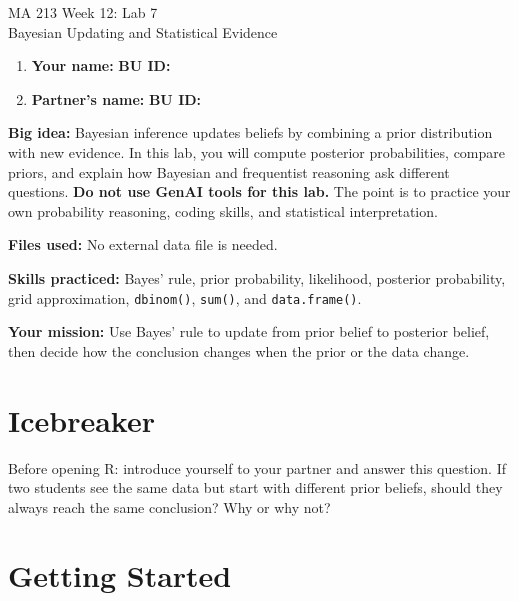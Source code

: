 \documentclass[11pt]{article}
\newcommand{\shortwritebox}[1]{
  \vspace{3pt}
  \noindent\fbox{
    \begin{minipage}{0.96\linewidth}
      \textbf{#1}\\[12pt]
      \rule{\linewidth}{0.4pt}\\[14pt]
    \end{minipage}
  }
  \vspace{6pt}
}
\begin{document}
\begin{center}
  {\LARGE MA 213 Week 12: Lab 7}\\[3pt]
  {\large Bayesian Updating and Statistical Evidence}
\end{center}

\begin{enumerate}
  \item \textbf{Your name:} \underline{\hspace{0.3\textwidth}} \hfill \textbf{BU ID:} \underline{\hspace{0.25\textwidth}}
  \item \textbf{Partner's name:} \underline{\hspace{0.3\textwidth}} \hfill \textbf{BU ID:} \underline{\hspace{0.25\textwidth}}
\end{enumerate}

\textbf{Big idea:} Bayesian inference updates beliefs by combining a prior distribution with new evidence. In this lab, you will compute posterior probabilities, compare priors, and explain how Bayesian and frequentist reasoning ask different questions.
\textbf{Do not use GenAI tools for this lab.} The point is to practice your own probability reasoning, coding skills, and statistical interpretation.

\textbf{Files used:} No external data file is needed.

\textbf{Skills practiced:} Bayes' rule, prior probability, likelihood, posterior probability, grid approximation, \texttt{dbinom()}, \texttt{sum()}, and \texttt{data.frame()}.

\textbf{Your mission:} Use Bayes' rule to update from prior belief to posterior belief, then decide how the conclusion changes when the prior or the data change.

\section*{Icebreaker}

Before opening R: introduce yourself to your partner and answer this question. If two students see the same data but start with different prior beliefs, should they always reach the same conclusion? Why or why not?

\shortwritebox{Warm-up response:}

\section*{Getting Started}
\end{document}
